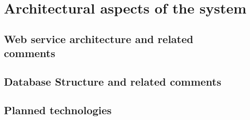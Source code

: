 \chapter{Architectural aspects of the system}\label{ch:architectural-aspects-of-the-system}


\section{Web service architecture and related comments}\label{sec:application-architecture-and-related-comments}



\section{Database Structure and related comments}\label{sec:database-structure-and-related-comments}



\section{Planned technologies}\label{sec:planned-technologies}


